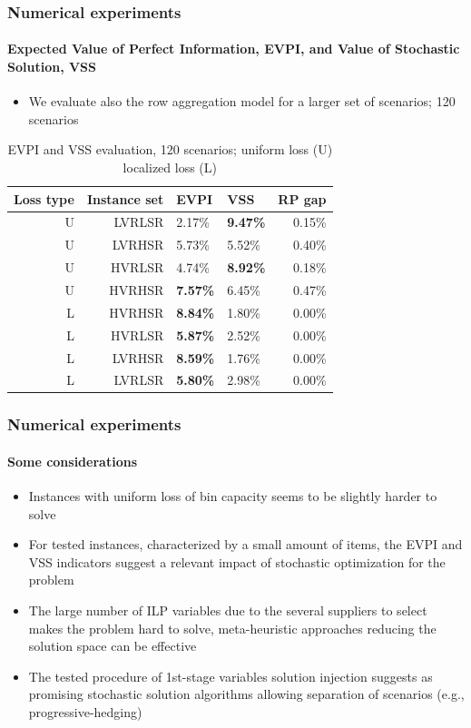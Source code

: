 \documentclass[9pt,xcolor={dvipsnames}]{beamer}
\begin{document}
\begin{frame}[allowframebreaks]
	\frametitle{Numerical experiments}
	\framesubtitle{Expected Value of Perfect Information, EVPI, and Value of Stochastic Solution, VSS}	
	\begin{itemize}
		\item We evaluate also the row aggregation model for a larger set of scenarios; 120 scenarios
	\end{itemize}
	\bigskip
	\begin{table}[h!]
		\centering
		\footnotesize
		\begin{tabular}{r r j f r}
			\hline
			Loss type & Instance set & EVPI & VSS & RP gap \\
			\hline
			U & LVRLSR & 2.17\% & \textbf{9.47\%} & 0.15\% \\
			U & LVRHSR & 5.73\% & 5.52\% & 0.40\% \\
			U & HVRLSR & 4.74\% & \textbf{8.92\%} & 0.18\% \\
			U & HVRHSR & \textbf{7.57\%} & 6.45\% & 0.47\% \\
			\hline
			L & HVRHSR & \textbf{8.84\%} & 1.80\% & 0.00\% \\
			L & HVRLSR & \textbf{5.87\%} & 2.52\% & 0.00\% \\
			L & LVRHSR & \textbf{8.59\%} & 1.76\% & 0.00\% \\
			L & LVRLSR & \textbf{5.80\%} & 2.98\% & 0.00\% \\
			\hline
		\end{tabular}
		\caption{EVPI and VSS evaluation, 120 scenarios; uniform loss (U) localized loss (L)}
		\label{tab:optres3}
	\end{table}
\end{frame}

\begin{frame}[allowframebreaks]
	\frametitle{Numerical experiments}
	\framesubtitle{Some considerations}	
	\begin{itemize}
		\item Instances with uniform loss of bin capacity seems to be slightly harder to solve
		\bigskip
		\item For tested instances, characterized by a small amount of items, the EVPI and VSS indicators suggest a relevant impact of stochastic optimization for the problem
		\bigskip
		\item The large number of ILP variables due to the several suppliers to select makes the problem hard to solve, meta-heuristic approaches reducing the solution space can be effective
		\bigskip
		\item The tested procedure of 1st-stage variables solution injection suggests as promising stochastic solution algorithms allowing separation of scenarios (e.g., progressive-hedging)
	\end{itemize}
\end{frame}
\end{document}
